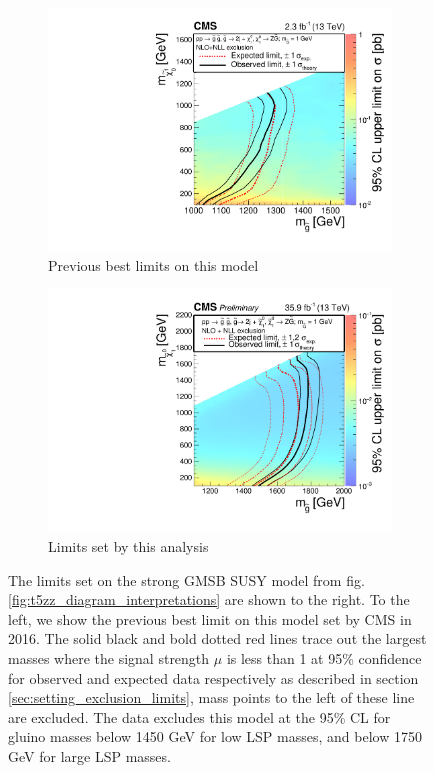     \begin{figure}[!h]
      \centering
        \begin{subfigure}[b]{0.4\textwidth}
          \label{fig:t5zz_interpretations_2015}
          \includegraphics[width=\textwidth]{figures/interpretations/t5zz_2015_exclusion.pdf}
          \caption{Previous best limits on this model}
        \end{subfigure}
        \begin{subfigure}[b]{0.4\textwidth}
          \label{fig:t5zz_interpretations_current}
          \includegraphics[width=\textwidth]{figures/interpretations/T5ZZ_Exclusion_13TeV.pdf}
          \caption{Limits set by this analysis}
        \end{subfigure}
      \caption[The limits set on the strong GMSB SUSY model.]{ \label{fig:t5zz_interpretation}
        The limits set on the strong GMSB SUSY model from fig. \ref{fig:t5zz_diagram_interpretations} are shown to the right. To the left, we show the previous best limit on this model set by CMS in 2016.\cite{paper_2016} The solid black and bold dotted red lines trace out the largest masses where the signal strength $\mu$ is less than 1 at 95\% confidence for observed and expected data respectively as described in section \ref{sec:setting_exclusion_limits}, mass points to the left of these line are excluded. The data excludes this model at the 95\% CL for gluino masses below 1450 GeV for low LSP masses, and below 1750 GeV for large LSP masses.
      }
    \end{figure}

